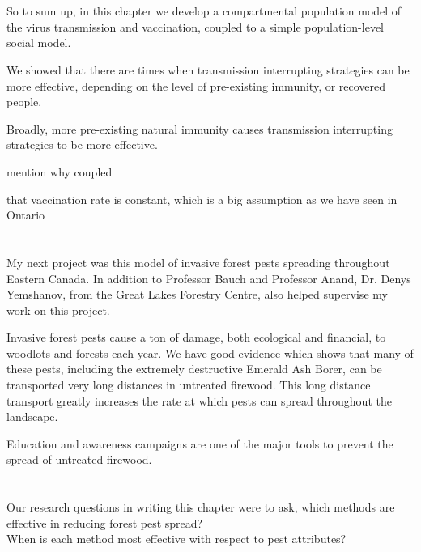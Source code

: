 \documentclass{article}
\begin{document}
\section{}

So to sum up, in this chapter we develop a compartmental population model of the virus transmission and vaccination, coupled to a simple population-level social model. 


We showed that there are times when transmission interrupting strategies can be more effective, depending on the level of pre-existing immunity, or recovered people. 

Broadly, more pre-existing natural immunity causes transmission interrupting strategies to be more effective.

mention why coupled

that vaccination rate is constant, which is a big assumption as we have seen in Ontario


\section{}

My next project was this model of invasive forest pests spreading throughout Eastern Canada. In addition to Professor Bauch and Professor Anand, Dr. Denys Yemshanov, from the Great Lakes Forestry Centre, also helped supervise my work on this project. 

Invasive forest pests cause a ton of damage, both ecological and financial, to woodlots and forests each year. We have good evidence which shows that many of these pests, including the extremely destructive Emerald Ash Borer, can be transported very long distances in untreated firewood. This long distance transport greatly increases the rate at which pests can spread throughout the landscape.

Education and awareness campaigns are one of the major tools to prevent the spread of untreated firewood. 


\section{}

Our research questions in writing this chapter were to ask, which methods are effective in reducing forest pest spread? \\
\vspace{0.5cm}
When is each method most effective with respect to pest attributes? 
\end{document}
